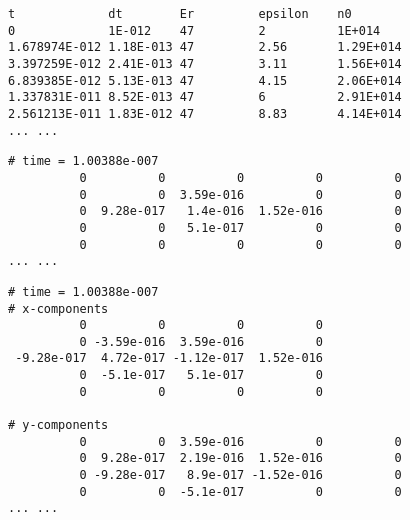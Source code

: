 \begin{lstfloat}[!tb]
	\begin{lstlisting}[style = mybase, label = code:history,
	caption = Example of overview file]
t             dt        Er         epsilon    n0        
0             1E-012    47         2          1E+014    
1.678974E-012 1.18E-013 47         2.56       1.29E+014
3.397259E-012 2.41E-013 47         3.11       1.56E+014
6.839385E-012 5.13E-013 47         4.15       2.06E+014
1.337831E-011 8.52E-013 47         6          2.91E+014
2.561213E-011 1.83E-012 47         8.83       4.14E+014
... ...
\end{lstlisting}
\end{lstfloat}

\begin{lstfloat}[!tb]
	\begin{lstlisting}[style = mybase, label = code:data1,
	caption = Example of scalar data file]
# time = 1.00388e-007
		  0          0          0          0          0
		  0          0  3.59e-016          0          0
		  0  9.28e-017   1.4e-016  1.52e-016          0
		  0          0   5.1e-017          0          0
		  0          0          0          0          0
... ...
\end{lstlisting}
\end{lstfloat}

\begin{lstfloat}[!tb]
\begin{lstlisting}[style = mybase, label = code:data2,
	caption = Example of vector data file]
# time = 1.00388e-007
# x-components
		  0          0          0          0
		  0 -3.59e-016  3.59e-016          0
 -9.28e-017  4.72e-017 -1.12e-017  1.52e-016
		  0  -5.1e-017   5.1e-017          0
		  0          0          0          0

# y-components
		  0          0  3.59e-016          0          0
		  0  9.28e-017  2.19e-016  1.52e-016          0
		  0 -9.28e-017   8.9e-017 -1.52e-016          0
		  0          0  -5.1e-017          0          0
... ...
\end{lstlisting}
\end{lstfloat}

